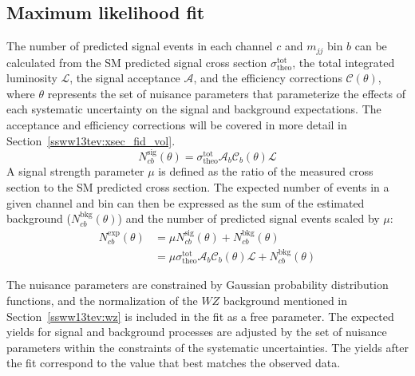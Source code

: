 \subsection{Maximum likelihood fit}\label{ssww13tev:xsec_fit_method}
The number of predicted signal events in each channel $c$ and $m_{jj}$ bin $b$ can be calculated from the SM predicted signal cross section $\sigma^{\textrm{tot}}_{\textrm{theo}}$, the total integrated luminosity $\mathcal{L}$, the signal acceptance $\mathcal{A}$, and the efficiency corrections $\mathcal{C}(\theta)$, where $\theta$ represents the set of nuisance parameters that parameterize the effects of each systematic uncertainty on the signal and background expectations.
The acceptance and efficiency corrections will be covered in more detail in Section~\ref{ssww13tev:xsec_fid_vol}.
\begin{equation}
  N_{cb}^{\textrm{sig}}(\theta) = \sigma^{\textrm{tot}}_{\textrm{theo}}\mathcal{A}_b\mathcal{C}_{b}(\theta)\mathcal{L}
  \label{eq:ssww13tev_xsec_nsig}
\end{equation}
A signal strength parameter $\mu$ is defined as the ratio of the measured cross section to the SM predicted cross section.
The expected number of events in a given channel and bin can then be expressed as the sum of the estimated background ($N_{cb}^{\textrm{bkg}}(\theta)$) and the number of predicted signal events scaled by $\mu$:
\begin{equation}
  \begin{aligned}
    N_{cb}^{\textrm{exp}}(\theta) &= \mu N_{cb}^{\textrm{sig}}(\theta) + N_{cb}^{\textrm{bkg}}(\theta) \\
                              &= \mu \sigma^{\textrm{tot}}_{\textrm{theo}}\mathcal{A}_b\mathcal{C}_{b}(\theta)\mathcal{L} + N_{cb}^{\textrm{bkg}}(\theta)
  \end{aligned}
  \label{eq:ssww13tev_xsec_nexp}
\end{equation}

The nuisance parameters are constrained by Gaussian probability distribution functions, and the normalization of the $WZ$ background mentioned in Section~\ref{ssww13tev:wz} is included in the fit as a free parameter.
The expected yields for signal and background processes are adjusted by the set of nuisance parameters within the constraints of the systematic uncertainties.
The yields after the fit correspond to the value that best matches the observed data.

